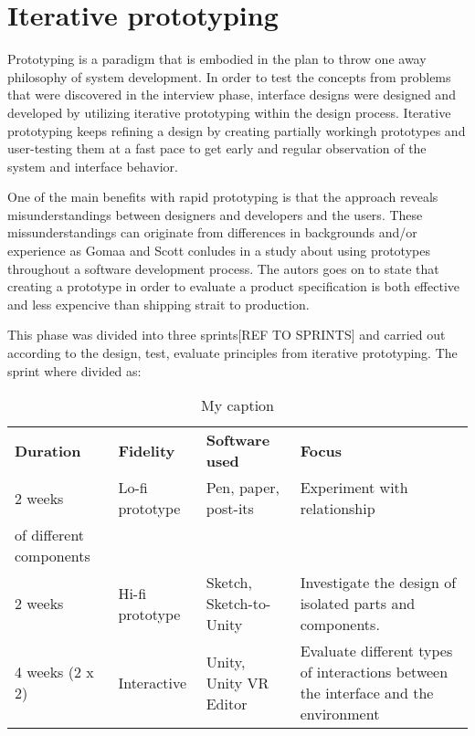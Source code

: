 \section{Iterative prototyping}
Prototyping is a paradigm that is embodied in the plan to throw one
away philosophy of system development. \cite{proto:Gomaa1981}
In order to test the concepts from problems that were discovered in the interview phase, interface designs were designed and developed by utilizing iterative prototyping within the design process. Iterative prototyping keeps refining a design by creating partially workingh prototypes and user-testing them at a fast pace to get early and regular observation of the system and interface behavior.

One of the main benefits with rapid prototyping is that the approach reveals misunderstandings between
designers and developers and the  users. These missunderstandings can originate from differences in backgrounds and/or experience as Gomaa and Scott conludes in a study about using prototypes throughout a software development process. The autors goes on to state that creating a prototype in order to evaluate a product specification is both effective and less expencive than shipping strait to production.
\cite{proto:Lichter1993}

This phase was divided into three sprints[REF TO SPRINTS] and carried out according to the design, test, evaluate principles from iterative prototyping. The sprint where divided as:

\begin{table}[]
\centering
\caption{My caption}
\label{my-label}
\begin{tabular}{llll}
\textbf{Duration} & \textbf{Fidelity}       & \textbf{Software used}  & \textbf{Focus}                                                                     \\
2 weeks                         & Lo-fi prototype  & Pen, paper, post-its    & Experiment with relationship \\ of different components                               \\
2 weeks                        & Hi-fi prototype & Sketch, Sketch-to-Unity & Investigate the design of isolated parts and components.                           \\
4 weeks (2 x 2)                 & Interactive   & Unity, Unity VR Editor  & Evaluate different types of interactions between the interface and the environment
\end{tabular}
\end{table}
